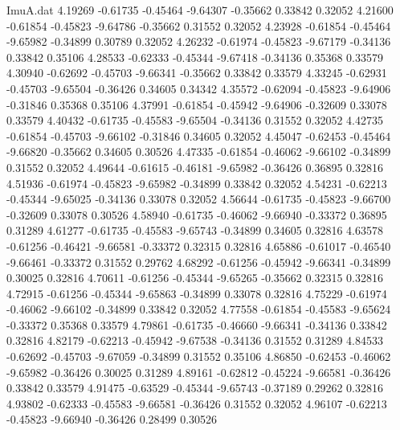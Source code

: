 \begin{filecontents}{ImuA.dat}
   4.19269   -0.61735   -0.45464   -9.64307   -0.35662    0.33842    0.32052
   4.21600   -0.61854   -0.45823   -9.64786   -0.35662    0.31552    0.32052
   4.23928   -0.61854   -0.45464   -9.65982   -0.34899    0.30789    0.32052
   4.26232   -0.61974   -0.45823   -9.67179   -0.34136    0.33842    0.35106
   4.28533   -0.62333   -0.45344   -9.67418   -0.34136    0.35368    0.33579
   4.30940   -0.62692   -0.45703   -9.66341   -0.35662    0.33842    0.33579
   4.33245   -0.62931   -0.45703   -9.65504   -0.36426    0.34605    0.34342
   4.35572   -0.62094   -0.45823   -9.64906   -0.31846    0.35368    0.35106
   4.37991   -0.61854   -0.45942   -9.64906   -0.32609    0.33078    0.33579
   4.40432   -0.61735   -0.45583   -9.65504   -0.34136    0.31552    0.32052
   4.42735   -0.61854   -0.45703   -9.66102   -0.31846    0.34605    0.32052
   4.45047   -0.62453   -0.45464   -9.66820   -0.35662    0.34605    0.30526
   4.47335   -0.61854   -0.46062   -9.66102   -0.34899    0.31552    0.32052
   4.49644   -0.61615   -0.46181   -9.65982   -0.36426    0.36895    0.32816
   4.51936   -0.61974   -0.45823   -9.65982   -0.34899    0.33842    0.32052
   4.54231   -0.62213   -0.45344   -9.65025   -0.34136    0.33078    0.32052
   4.56644   -0.61735   -0.45823   -9.66700   -0.32609    0.33078    0.30526
   4.58940   -0.61735   -0.46062   -9.66940   -0.33372    0.36895    0.31289
   4.61277   -0.61735   -0.45583   -9.65743   -0.34899    0.34605    0.32816
   4.63578   -0.61256   -0.46421   -9.66581   -0.33372    0.32315    0.32816
   4.65886   -0.61017   -0.46540   -9.66461   -0.33372    0.31552    0.29762
   4.68292   -0.61256   -0.45942   -9.66341   -0.34899    0.30025    0.32816
   4.70611   -0.61256   -0.45344   -9.65265   -0.35662    0.32315    0.32816
   4.72915   -0.61256   -0.45344   -9.65863   -0.34899    0.33078    0.32816
   4.75229   -0.61974   -0.46062   -9.66102   -0.34899    0.33842    0.32052
   4.77558   -0.61854   -0.45583   -9.65624   -0.33372    0.35368    0.33579
   4.79861   -0.61735   -0.46660   -9.66341   -0.34136    0.33842    0.32816
   4.82179   -0.62213   -0.45942   -9.67538   -0.34136    0.31552    0.31289
   4.84533   -0.62692   -0.45703   -9.67059   -0.34899    0.31552    0.35106
   4.86850   -0.62453   -0.46062   -9.65982   -0.36426    0.30025    0.31289
   4.89161   -0.62812   -0.45224   -9.66581   -0.36426    0.33842    0.33579
   4.91475   -0.63529   -0.45344   -9.65743   -0.37189    0.29262    0.32816
   4.93802   -0.62333   -0.45583   -9.66581   -0.36426    0.31552    0.32052
   4.96107   -0.62213   -0.45823   -9.66940   -0.36426    0.28499    0.30526

\end{filecontents}
